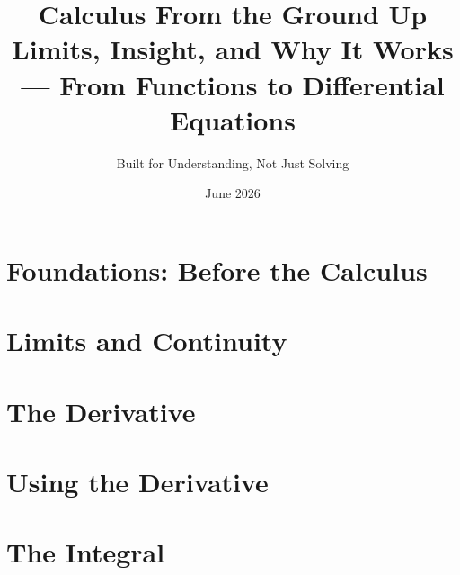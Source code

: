 \documentclass[11pt]{book}
\title{\textbf{Calculus From the Ground Up}\\[0.4em]\large Limits, Insight, and Why It Works --- From Functions to Differential Equations}
\author{Built for Understanding, Not Just Solving}
\date{June 2026}
\begin{document}
\frontmatter
\maketitle

\tableofcontents

\mainmatter

\part{Foundations: Before the Calculus}






\part{Limits and Continuity}





\part{The Derivative}







\part{Using the Derivative}





\part{The Integral}








\end{document}
